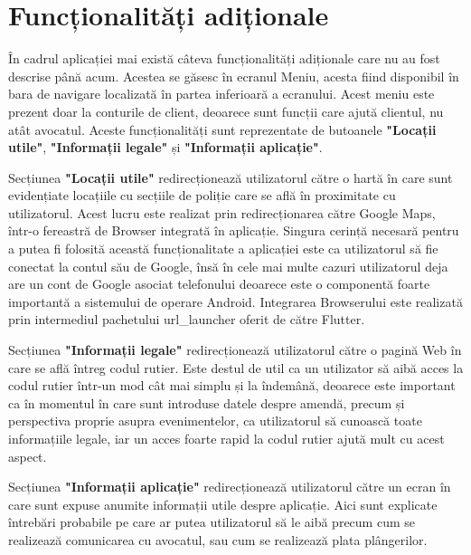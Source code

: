\documentclass[12pt,a4paper]{report}
\theoremstyle{definition}
\theoremstyle{remark}
\begin{document}
\section{Funcționalități adiționale}
În cadrul aplicației mai există câteva funcționalități adiționale care nu au fost descrise până acum. Acestea se găsesc în ecranul Meniu, acesta fiind disponibil în bara de navigare localizată în partea inferioară a ecranului. Acest meniu este prezent doar la conturile de client, deoarece sunt funcții care ajută clientul, nu atât avocatul. Aceste funcționalități sunt reprezentate de butoanele \textbf{"Locații utile"}, \textbf{"Informații legale"} și \textbf{"Informații aplicație"}.

Secțiunea \textbf{"Locații utile"} redirecționează utilizatorul către o hartă în care sunt evidențiate locațiile cu secțiile de poliție care se află în proximitate cu utilizatorul. Acest lucru este realizat prin redirecționarea către Google Maps, într-o fereastră de Browser integrată în aplicație. Singura cerință necesară pentru a putea fi folosită această funcționalitate a aplicației este ca utilizatorul să fie conectat la contul său de Google, însă în cele mai multe cazuri utilizatorul deja are un cont de Google asociat telefonului deoarece este o componentă foarte importantă a sistemului de operare Android. Integrarea Browserului este realizată prin intermediul pachetului url\_launcher oferit de către Flutter.

Secțiunea \textbf{"Informații legale"} redirecționează utilizatorul către o pagină Web în care se află întreg codul rutier. Este destul de util ca un utilizator să aibă acces la codul rutier într-un mod cât mai simplu și la îndemână, deoarece este important ca în momentul în care sunt introduse datele despre amendă, precum și perspectiva proprie asupra evenimentelor, ca utilizatorul să cunoască toate informațiile legale, iar un acces foarte rapid la codul rutier ajută mult cu acest aspect. 

Secțiunea \textbf{"Informații aplicație"} redirecționează utilizatorul către un ecran în care sunt expuse anumite informații utile despre aplicație. Aici sunt explicate întrebări probabile pe care ar putea utilizatorul să le aibă precum cum se realizează comunicarea cu avocatul, sau cum se realizează plata plângerilor.
\end{document}

